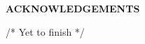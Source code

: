 \newpage
\thispagestyle{plain}

{\centering\bf  ACKNOWLEDGEMENTS\\}\par\vskip 2cm

\singleSpacing
\noindent
/* Yet to finish */

\par\vskip 2cm

\doubleSpacing

\newpage




